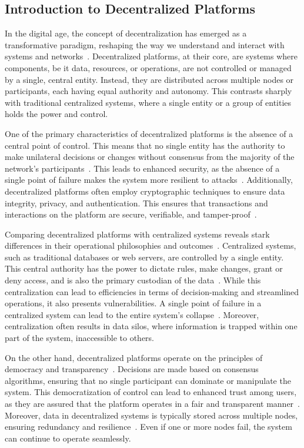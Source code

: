 \subsection{Introduction to Decentralized Platforms}
In the digital age, the concept of decentralization has emerged as a transformative paradigm, reshaping the way we understand and interact with systems and networks~\cite{Tverdokhlib.2022}. Decentralized platforms, at their core, are systems where components, be it data, resources, or operations, are not controlled or managed by a single, central entity. Instead, they are distributed across multiple nodes or participants, each having equal authority and autonomy. This contrasts sharply with traditional centralized systems, where a single entity or a group of entities holds the power and control.

One of the primary characteristics of decentralized platforms is the absence of a central point of control. This means that no single entity has the authority to make unilateral decisions or changes without consensus from the majority of the network's participants~\cite{SEFRAOUI.2022}. This leads to enhanced security, as the absence of a single point of failure makes the system more resilient to attacks~\cite{Maffiola.2022}. Additionally, decentralized platforms often employ cryptographic techniques to ensure data integrity, privacy, and authentication. This ensures that transactions and interactions on the platform are secure, verifiable, and tamper-proof~\cite{SEFRAOUI.2022}.

Comparing decentralized platforms with centralized systems reveals stark differences in their operational philosophies and outcomes~\cite{Maffiola.2022}. Centralized systems, such as traditional databases or web servers, are controlled by a single entity. This central authority has the power to dictate rules, make changes, grant or deny access, and is also the primary custodian of the data~\cite{Maffiola.2022}. While this centralization can lead to efficiencies in terms of decision-making and streamlined operations, it also presents vulnerabilities. A single point of failure in a centralized system can lead to the entire system's collapse~\cite{Maffiola.2022}. Moreover, centralization often results in data silos, where information is trapped within one part of the system, inaccessible to others.

On the other hand, decentralized platforms operate on the principles of democracy and transparency~\cite{SEFRAOUI.2022}. Decisions are made based on consensus algorithms, ensuring that no single participant can dominate or manipulate the system. This democratization of control can lead to enhanced trust among users, as they are assured that the platform operates in a fair and transparent manner~\cite{Hasan.2022}. Moreover, data in decentralized systems is typically stored across multiple nodes, ensuring redundancy and resilience~\cite{Hasan.2022}. Even if one or more nodes fail, the system can continue to operate seamlessly.

